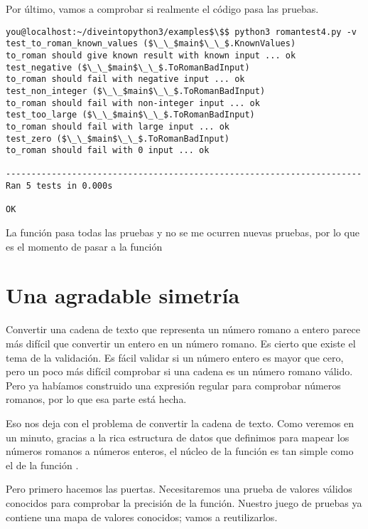 Por último, vamos a comprobar si realmente el código pasa las pruebas.

\noindent\begin{minipage}{\textwidth}
\begin{lstlisting}[mathescape=True]
you@localhost:~/diveintopython3/examples$\$$ python3 romantest4.py -v
test_to_roman_known_values ($\_\_$main$\_\_$.KnownValues)
to_roman should give known result with known input ... ok
test_negative ($\_\_$main$\_\_$.ToRomanBadInput)
to_roman should fail with negative input ... ok
test_non_integer ($\_\_$main$\_\_$.ToRomanBadInput)
to_roman should fail with non-integer input ... ok
test_too_large ($\_\_$main$\_\_$.ToRomanBadInput)
to_roman should fail with large input ... ok
test_zero ($\_\_$main$\_\_$.ToRomanBadInput)
to_roman should fail with 0 input ... ok

----------------------------------------------------------------------
Ran 5 tests in 0.000s

OK
\end{lstlisting}
\end{minipage}

La función  pasa todas las pruebas y no se me ocurren nuevas pruebas, por lo que es el momento de pasar a la función 


\section{Una agradable simetría}

Convertir una cadena de texto que representa un número romano a entero parece más difícil que convertir un entero en un número romano. Es cierto que existe el tema de la validación. Es fácil validar si un número entero es mayor que cero, pero un poco más difícil comprobar si una cadena es un número romano válido. Pero ya habíamos construido una expresión regular para comprobar números romanos, por lo que esa parte está hecha.

Eso nos deja con el problema de convertir la cadena de texto. Como veremos en un minuto, gracias a la rica estructura de datos que definimos para mapear los números romanos a números enteros, el núcleo de la función  es tan simple como el de la función .

Pero primero hacemos las puertas. Necesitaremos una prueba de valores válidos conocidos para comprobar la precisión de la función. Nuestro juego de pruebas ya contiene una mapa de valores conocidos; vamos a reutilizarlos.


